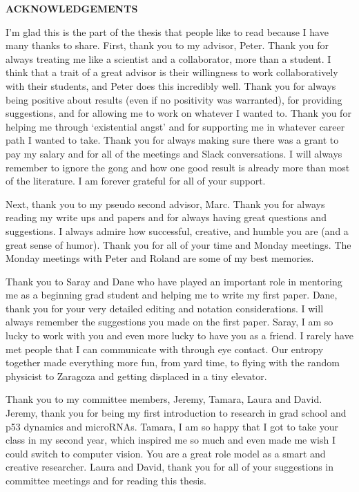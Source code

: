 
\begin{center}
\vspace*{52pt}
{\Large \textbf{ACKNOWLEDGEMENTS}}
\end{center}

I'm glad this is the part of the thesis that people like to read because I have many thanks to share. First, thank you to my advisor, Peter. Thank you for always treating me like a scientist and a collaborator, more than a student. I think that a trait of a great advisor is their willingness to work collaboratively with their students, and Peter does this incredibly well. Thank you for always being positive about results (even if no positivity was warranted), for providing suggestions, and for allowing me to work on whatever I wanted to. Thank you for helping me through `existential angst' and for supporting me in whatever career path I wanted to take. Thank you for always making sure there was a grant to pay my salary and for all of the meetings and Slack conversations. I will always remember to ignore the gong and how one good result is already more than most of the literature. I am forever grateful for all of your support.

Next, thank you to my pseudo second advisor, Marc. Thank you for always reading my write ups and papers and for always having great questions and suggestions. I always admire how successful, creative, and humble you are (and a great sense of humor). Thank you for all of your time and Monday meetings. The Monday meetings with Peter and Roland are some of my best memories. 

Thank you to Saray and Dane who have played an important role in mentoring me as a beginning grad student and helping me to write my first paper. Dane, thank you for your very detailed editing and notation considerations. I will always remember the suggestions you made on the first paper. Saray, I am so lucky to work with you and even more lucky to have you as a friend. I rarely have met people that I can communicate with through eye contact. Our entropy together made everything more fun, from yard time, to flying with the random physicist to Zaragoza and getting displaced in a tiny elevator. 

Thank you to my committee members, Jeremy, Tamara, Laura and David. Jeremy, thank you for being my first introduction to research in grad school and p53 dynamics and microRNAs. Tamara, I am so happy that I got to take your class in my second year, which inspired me so much and even made me wish I could switch to computer vision. You are a great role model as a smart and creative researcher. Laura and David, thank you for all of your suggestions in committee meetings and for reading this thesis.

